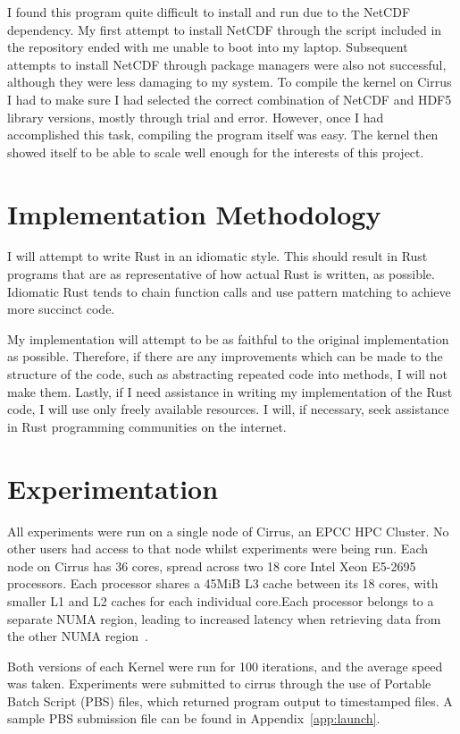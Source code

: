 I found this program quite difficult to install and run due to the NetCDF dependency. My first attempt to install NetCDF through the script included in the repository ended with me unable to boot into my laptop. Subsequent attempts to install NetCDF through package managers were also not successful, although they were less damaging to my system. To compile the kernel on Cirrus I had to make sure I had selected the correct combination of NetCDF and HDF5 library versions, mostly through trial and error. However, once I had accomplished this task, compiling the program itself was easy. The kernel then showed itself to be able to scale well enough for the interests of this project.

\section{Implementation Methodology}
I will attempt to write Rust in an idiomatic style. This should result in Rust programs that are as representative of how actual Rust is written, as possible. Idiomatic Rust tends to chain function calls and use pattern matching to achieve more succinct code.

My implementation will attempt to be as faithful to the original implementation as possible. Therefore, if there are any improvements which can be made to the structure of the code, such as abstracting repeated code into methods, I will not make them. Lastly, if I need assistance in writing my implementation of the Rust code, I will use only freely available resources. I will, if necessary, seek assistance in Rust programming communities on the internet.


\section{Experimentation}
All experiments were run on a single node of Cirrus, an EPCC HPC Cluster. No other users had access to that node whilst experiments were being run. Each node on Cirrus has 36 cores, spread across two 18 core Intel Xeon E5-2695 processors. Each processor shares a 45MiB L3 cache between its 18 cores, with smaller L1 and L2 caches for each individual core.Each processor belongs to a separate NUMA region, leading to increased latency when retrieving data from the other NUMA region~\cite{CirrusHardware}.

Both versions of each Kernel were run for 100 iterations, and the average speed was taken. Experiments were submitted to cirrus through the use of Portable Batch Script (PBS) files, which returned program output to timestamped files. A sample PBS submission file can be found in Appendix~\ref{app:launch}.

